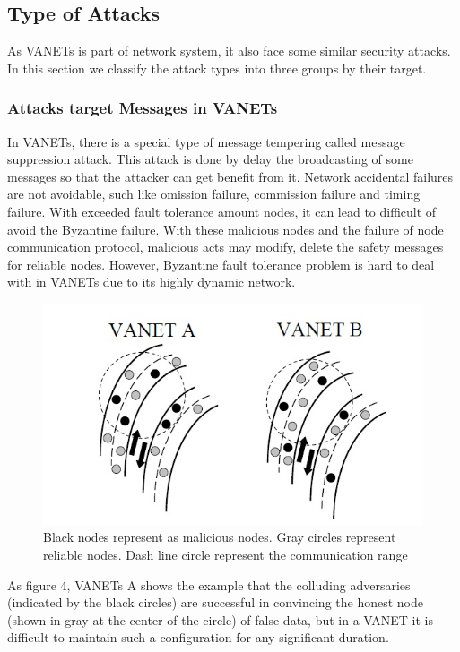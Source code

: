 \documentclass[conference]{IEEEtran}
\begin{document}
\subsection{Type of Attacks}
As VANETs is part of network system, it also face some similar security attacks. In this section we classify the attack types into three groups by their target. 
\subsubsection{Attacks target Messages in VANETs}
In VANETs, there is a special type of message tempering called message suppression attack\cite{35}. This attack is done by delay the broadcasting of some messages so that the attacker
can get benefit from it. Network accidental failures are not avoidable, such like omission failure, commission failure and timing failure. With exceeded fault tolerance amount nodes, it can lead to difficult of avoid the Byzantine failure. With these malicious nodes and the failure of node communication protocol, malicious acts may modify, delete the safety messages for reliable nodes. However, Byzantine fault tolerance problem is hard to deal with in VANETs due to its highly dynamic network.
\begin{figure}[h]
  \includegraphics[width=\linewidth]{Control.jpg}
  \caption{Black nodes represent as malicious nodes. Gray circles represent reliable nodes. Dash line circle represent the communication range}
  \label{fig:Attack2}
\end{figure}
As figure 4, VANETs A shows the example that the colluding adversaries (indicated by the black circles) are successful in convincing the honest node (shown in gray at the center of the circle) of false data, but in a VANET it is difficult to maintain such a configuration for any significant duration\cite{Way}.
\end{document}
